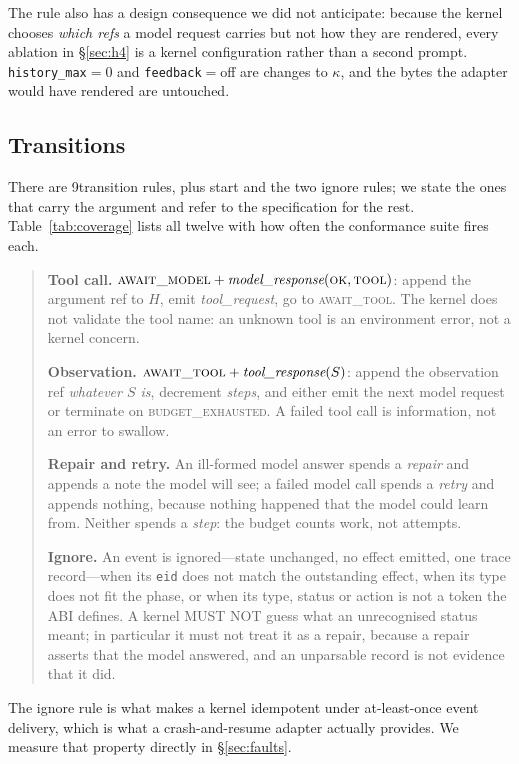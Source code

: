 \documentclass[11pt,a4paper]{article}
\begin{document}
The rule also has a design consequence we did not anticipate: because the
kernel chooses \emph{which refs} a model request carries but not how they are
rendered, every ablation in \S\ref{sec:h4} is a kernel configuration rather
than a second prompt. \texttt{history\_max}$=0$ and \texttt{feedback}$=$off are
changes to $\kappa$, and the bytes the adapter would have rendered are
untouched.

\subsection{Transitions}

There are 9transition rules, plus start and the two ignore rules;
we state the ones that carry the argument and refer to the specification for
the rest. Table~\ref{tab:coverage} lists all twelve with how often the
conformance suite fires each.

\begin{quote}
\textbf{Tool call.} $\textsc{await\_model} + \textit{model\_response}
(\textsc{ok}, \textsc{tool})$: append the argument ref to $H$, emit
\textit{tool\_request}, go to \textsc{await\_tool}. The kernel does not validate
the tool name: an unknown tool is an environment error, not a kernel concern.

\textbf{Observation.} $\textsc{await\_tool} + \textit{tool\_response}(S)$:
append the observation ref \emph{whatever $S$ is}, decrement \textit{steps},
and either emit the next model request or terminate on
\textsc{budget\_exhausted}. A failed tool call is information, not an error to
swallow.

\textbf{Repair and retry.} An ill-formed model answer spends a \textit{repair}
and appends a note the model will see; a failed model call spends a
\textit{retry} and appends nothing, because nothing happened that the model
could learn from. Neither spends a \textit{step}: the budget counts work, not
attempts.

\textbf{Ignore.} An event is ignored---state unchanged, no effect emitted, one
trace record---when its \texttt{eid} does not match the outstanding effect, when
its type does not fit the phase, or when its type, status or action is not a
token the ABI defines. A kernel MUST NOT guess what an unrecognised status
meant; in particular it must not treat it as a repair, because a repair asserts
that the model answered, and an unparsable record is not evidence that it did.
\end{quote}

The ignore rule is what makes a kernel idempotent under at-least-once event
delivery, which is what a crash-and-resume adapter actually provides. We
measure that property directly in \S\ref{sec:faults}.
\end{document}
